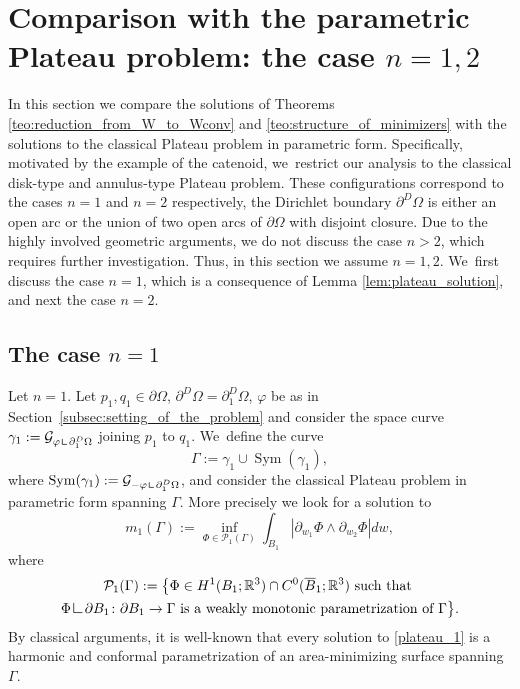 \documentclass[JEP,XML,SOM,Unicode, NoFloatCountersInSection,published]{cedram}
\DeclareMathOperator{\Sym}{Sym}
\newcommand{\R}{\mathbb{R}}
\let\Om\Omega
\newcommand{\resa}{\mathop{\hbox{\vrule height 7pt width 0.5pt depth 0pt
\vrule height 0.5pt width 6pt depth 0pt}}\nolimits}
\newcommand{\resb}{\mathop{\hbox{\vrule height 4pt width 0.5pt depth 0pt
\vrule height 0.5pt width 3pt depth 0pt}}\nolimits}
\newcommand{\res}{\mathchoice{\resa}{\resa}{\resb}{\resb}}
\theoremstyle{definition}
\begin{document}
\section{Comparison with the parametric Plateau problem: the case \texorpdfstring{$n=1,2$}{12}}
\label{sec:comparison_with_the_parametric_Plateau_problem:the_case_n=1,2}

In this section we compare the solutions of
Theorems \ref{teo:reduction_from_W_to_Wconv} and \ref{teo:structure_of_minimizers} with the solutions to the classical Plateau problem in parametric form.
Specifically, motivated by the example of the catenoid, we~restrict our analysis to the classical
disk-type and annulus-type Plateau problem.
These configurations correspond to the cases $n=1$ and $n=2$ respectively, \ie the Dirichlet boundary $\partial^D\Om$ is either an open arc or
the union of two open arcs of $\partial\Om$ with disjoint closure.
Due to the highly involved geometric arguments,
we do not discuss the case $n>2$, which requires further investigation.
Thus, in this section we assume $n=1,2$. We~first discuss the case $n=1$, which is a consequence of
Lemma \ref{lem:plateau_solution}, and next the case $n=2$.

\subsection{The case $n=1$}\label{sec:the_case_n=1}

Let $n=1$. Let $p_1,q_1\in\partial\Om$, $\partial^D\Om=\partial^D_1\Om$, $\varphi$ be as in Section~\ref{subsec:setting_of_the_problem} and
consider the space curve $\gamma_1:=\mathcal{G}_{\varphi\res\partial_1^D\Om}$ joining $p_1$ to $q_1$. We~define the curve
\[
\Gamma:=\gamma_1\cup \Sym(\gamma_1),
\]
where $\Sym(\gamma_1):=\mathcal{G}_{-\varphi\res\partial_1^D\Om}$,
and
consider the classical Plateau problem in parametric form
spanning $\Gamma$. More precisely we look for a solution to
\begin{equation}\label{plateau_1}
m_1(\Gamma):=\inf_{\Phi\in\mathcal{P}_1(\Gamma)}\int_{B_1}|\partial_{w_1}\Phi\wedge\partial_{w_2}\Phi|dw,
\end{equation}
where
\begin{multline}\label{def:adm_Phi}
\mathcal{P}_1(\Gamma):=\bigl\{\Phi\in H^1( B_1;\R^3)\cap C^0(\overline B_1;\R^3)\text{ such that }\\\Phi\res\partial B_1\colon\partial B_1\to\Gamma \text{ is a weakly monotonic parametrization of $\Gamma$}
\bigr\}.
\end{multline}
By classical arguments, it is well-known that
every solution to \eqref{plateau_1} is a harmonic and conformal parametrization of an area-minimizing surface spanning $\Gamma$.
\end{document}
